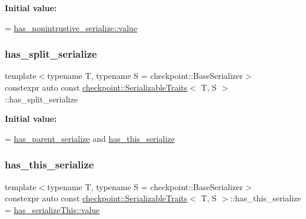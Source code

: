 {\bfseries Initial value\+:}
\begin{DoxyCode}
=
    \hyperlink{structdetection_1_1detector_a6d7d0e1bdf5903db9edbe448edccf83b}{has\_nonintrustive\_serialize::value}
\end{DoxyCode}
\mbox{\label{structcheckpoint_1_1_serializable_traits_a1fa333e360a0dfeafebe350436ae9141}} 
\subsubsection{\texorpdfstring{has\+\_\+split\+\_\+serialize}{has\_split\_serialize}}
{\footnotesize\ttfamily template$<$typename T, typename S = checkpoint\+::\+Base\+Serializer$>$ \\
constexpr auto const \hyperlink{structcheckpoint_1_1_serializable_traits}{checkpoint\+::\+Serializable\+Traits}$<$ T, S $>$\+::has\+\_\+split\+\_\+serialize\hspace{0.3cm}{\ttfamily [static]}}

{\bfseries Initial value\+:}
\begin{DoxyCode}
=
    \hyperlink{structcheckpoint_1_1_serializable_traits_a122e712dd9adffac78f239a7c30b0a8f}{has\_parent\_serialize} and \hyperlink{structcheckpoint_1_1_serializable_traits_ab228ede8ce64a9aaebf9ce43ac388400}{has\_this\_serialize}
\end{DoxyCode}
\mbox{\label{structcheckpoint_1_1_serializable_traits_ab228ede8ce64a9aaebf9ce43ac388400}} 
\subsubsection{\texorpdfstring{has\+\_\+this\+\_\+serialize}{has\_this\_serialize}}
{\footnotesize\ttfamily template$<$typename T, typename S = checkpoint\+::\+Base\+Serializer$>$ \\
constexpr auto const \hyperlink{structcheckpoint_1_1_serializable_traits}{checkpoint\+::\+Serializable\+Traits}$<$ T, S $>$\+::has\+\_\+this\+\_\+serialize = \hyperlink{structdetection_1_1detector_a6d7d0e1bdf5903db9edbe448edccf83b}{has\+\_\+serialize\+This\+::value}\hspace{0.3cm}{\ttfamily [static]}}

